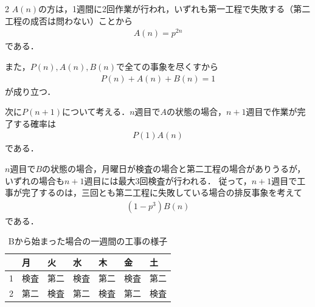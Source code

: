 \documentclass[../../main.tex]{subfiles}
\begin{document}
\begin{multicols}{2}
  $A(n)$の方は，1週間に2回作業が行われ，いずれも第一工程で失敗する（第二工程の成否は問わない）ことから
  \begin{align}
    A(n) = p^{2n} \label{eq:2}
  \end{align}
  である．

  また，$P(n),A(n),B(n)$で全ての事象を尽くすから
  \begin{align}
    P(n) + A(n) + B(n) = 1 \label{eq:3}
  \end{align}
  が成り立つ．

  次に$P(n+1)$について考える．$n$週目で$A$の状態の場合，$n+1$週目で作業が完了する確率は
  \begin{align}
    P(1)A(n)
  \end{align}
  である．

  $n$週目で$B$の状態の場合，月曜日が検査の場合と第二工程の場合がありうるが，いずれの場合も$n+1$週目には最大$3$回検査が行われる．
  従って，$n+1$週目で工事が完了するのは，三回とも第二工程に失敗している場合の排反事象を考えて
  \begin{align}
    (1-p^3)B(n)
  \end{align}
  である．

  \begin{table}[H]
    \centering
    \caption{Bから始まった場合の一週間の工事の様子}
    \label{1994-3:table:2}
    \begin{tabular}{|c||l|l|l|l|l|l|} \hline
      & 月  & 火  & 水  & 木  & 金  & 土  \\ \hline\hline
      1 & 検査 & 第二 & 検査 & 第二 & 検査 & 第二 \\ \hline
      2 & 第二 & 検査 & 第二 & 検査 & 第二 & 検査 \\ \hline
    \end{tabular}
  \end{table}


\end{multicols}
\end{document}
